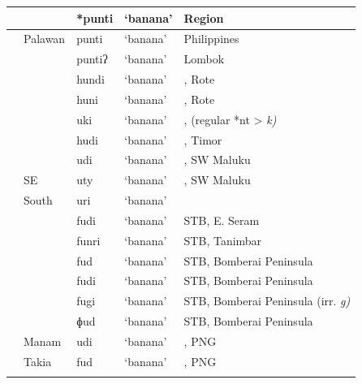 {\begin{xltabular}{\textwidth}{>{\hspace{-\tabcolsep}}l<{\hspace{-\tabcolsep}}>{\hspace{-\tabcolsep}\enspace}llll}
\lsptoprule
{}			&		&	*punti	&	‘banana’	&	Region		\\ \midrule
	&	Palawan	&	{\hr}punti	&	‘banana’	&	Philippines		\\
	&		&	{\hr}puntiʔ	&	‘banana’	&	Lombok		\\
\rcl	&		&	{\hr}hundi	&	‘banana’	&	, Rote		\\
\rcl	&		&	{\hr}huni	&	‘banana’	&	, Rote		\\
\rcl	&	 	&	  {\hr}uki	&	‘banana’	&	, (regular *nt > \it{k})		\\
\rcl	&		&	{\hr}hudi	&	‘banana’	&	, Timor		\\
\rcl	&		&	  {\hr}udi	&	‘banana’	&	, SW Maluku		\\
\rcl	&	SE 	&	  {\hr}uty	&	‘banana’	&	, SW Maluku		\\
\rcl	&	South 	&	 {\hr}uri	&	‘banana’	&			\\
\rcl	&		&	{\hr}fudi	&	‘banana’	&	STB, E. Seram		\\
\rcl	&		&	{\hr}funri	&	‘banana’	&	STB, Tanimbar		\\
\rcl	&		&	{\hr}fud	&	‘banana’	&	STB, Bomberai Peninsula		\\
\rcl	&		&	{\hr}fudi	&	‘banana’	&	STB, Bomberai Peninsula		\\
\rcl	&		&	{\hr}fugi	&	‘banana’	&	STB, Bomberai Peninsula (irr. \it{g})		\\
\rcl	&		&	{\hr}ɸud	&	‘banana’	&	STB, Bomberai Peninsula		\\
	&	Manam 	&	  {\hr}udi	&	‘banana’	&	, PNG		\\
	&	Takia	&	{\hr}fud	&	‘banana’	&	, PNG		\\
\lspbottomrule
\end{xltabular}\addtocounter{table}{-1}}

